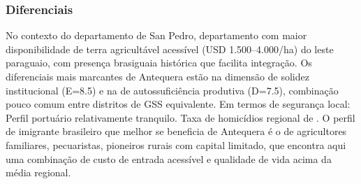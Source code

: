 \subsubsection*{Diferenciais}\label{dif-antequera-0202}
No contexto do departamento de San Pedro, departamento com maior disponibilidade de terra agricultável acessível (USD 1.500–4.000/ha) do leste paraguaio, com presença brasiguaia histórica que facilita integração. Os diferenciais mais marcantes de Antequera estão na dimensão de solidez institucional (E=8.5) e na de autossuficiência produtiva (D=7.5), combinação pouco comum entre distritos de GSS equivalente. Em termos de segurança local: Perfil portuário relativamente tranquilo. Taxa de homicídios regional de . O perfil de imigrante brasileiro que melhor se beneficia de Antequera é o de agricultores familiares, pecuaristas, pioneiros rurais com capital limitado, que encontra aqui uma combinação de custo de entrada acessível e qualidade de vida acima da média regional.
